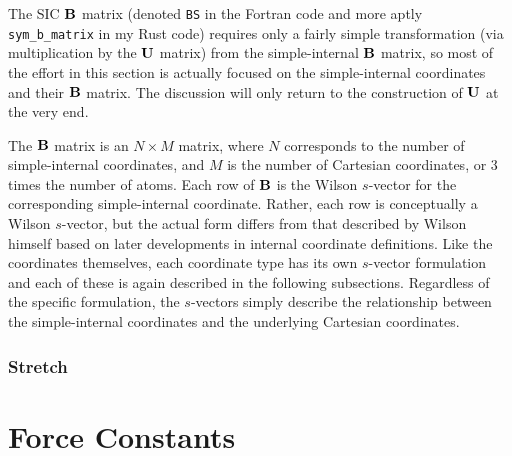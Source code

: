 \documentclass{article}
\begin{document}
The SIC $\vb B$ matrix (denoted \verb|BS| in the Fortran code and more aptly
\verb|sym_b_matrix| in my Rust code) requires only a fairly simple
transformation (via multiplication by the $\vb U$ matrix) from the
simple-internal $\vb B$ matrix, so most of the effort in this section is
actually focused on the simple-internal coordinates and their $\vb B$ matrix.
The discussion will only return to the construction of $\vb U$ at the very end.

The $\vb B$ matrix is an $N \times M$ matrix, where $N$ corresponds to the
number of simple-internal coordinates, and $M$ is the number of Cartesian
coordinates, or 3 times the number of atoms. Each row of $\vb B$ is the Wilson
$s$-vector for the corresponding simple-internal coordinate. Rather, each row is
conceptually a Wilson $s$-vector, but the actual form differs from that
described by Wilson himself based on later developments in internal coordinate
definitions. Like the coordinates themselves, each coordinate type has its own
$s$-vector formulation and each of these is again described in the following
subsections. Regardless of the specific formulation, the $s$-vectors simply
describe the relationship between the simple-internal coordinates and the
underlying Cartesian coordinates.

\subsubsection{Stretch}
\label{sec:bmat-stre}

\section{Force Constants}
\label{sec:fcs}
\end{document}
